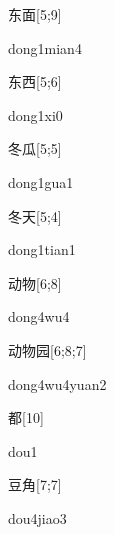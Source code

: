 \begin{verbete}{东面}[5;9]
\begin{pronuncia}{dong1mian4}
\end{pronuncia}
\end{verbete}

\begin{verbete}[dong1xi0]{东西}[5;6]
\begin{pronuncia}{dong1xi0}
\end{pronuncia}
\end{verbete}

\begin{verbete}{冬瓜}[5;5]
\begin{pronuncia}{dong1gua1}
\end{pronuncia}
\end{verbete}

\begin{verbete}{冬天}[5;4]
\begin{pronuncia}{dong1tian1}
\end{pronuncia}
\end{verbete}

\begin{verbete}[dong4wu4]{动物}[6;8]
\begin{pronuncia}{dong4wu4}
\end{pronuncia}
\end{verbete}

\begin{verbete}{动物园}[6;8;7]
\begin{pronuncia}{dong4wu4yuan2}
\end{pronuncia}
\end{verbete}

\begin{verbete}[dou1]{都}[10]
\begin{pronuncia}{dou1}
\end{pronuncia}
\end{verbete}

\begin{verbete}{豆角}[7;7]
\begin{pronuncia}{dou4jiao3}
\end{pronuncia}
\end{verbete}

